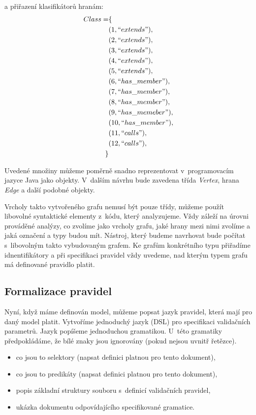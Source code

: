 a přiřazení klasifikátorů hranám:
\begin{align*}
  Class = &\{ \\
  &(1, ``extends"), \\
  &(2, ``extends"), \\
  &(3, ``extends"), \\
  &(4, ``extends"), \\
  &(5, ``extends"), \\
  &(6, ``has\_member"), \\
  &(7, ``has\_member"), \\
  &(8, ``has\_member"), \\
  &(9, ``has\_memeber"), \\
  &(10, ``has\_member"), \\
  &(11, ``calls"), \\
  &(12, ``calls"), \\
  \}
\end{align*}

Uvedené množiny můžeme poměrně snadno reprezentovat v~programovacím jazyce Java jako objekty. V~dalším návrhu bude zavedena třída \emph{Vertex}, hrana \emph{Edge} a další podobné objekty.

Vrcholy takto vytvořeného grafu nemusí být pouze třídy, můžeme použít libovolné syntaktické elementy z~kódu, který analyzujeme. Vždy záleží na úrovni prováděné analýzy, co zvolíme jako vrcholy grafu, jaké hrany mezi nimi zvolíme a jaká označení a typy budou mít. Nástroj, který budeme navrhovat bude počítat s~libovolným takto vybudovaným grafem. Ke grafům konkrétního typu přiřadíme idnentifikátory a při specifikaci pravidel vždy uvedeme, nad kterým typem grafu má definované pravidlo platit.

\subsection{Formalizace pravidel}
\label{design-rules_formalization}
Nyní, když máme definován model, můžeme popsat jazyk pravidel, která mají pro daný model platit. Vytvoříme jednoduchý jazyk (DSL) pro specifikaci validačních parametrů. Jazyk popíšeme jednoduchou gramatikou. U~této gramatiky předpokládáme, že bílé znaky jsou ignorovány (pokud nejsou uvnitř řetězce).


\begin{itemize}
\item co jsou to selektory (napsat definici platnou pro tento dokument),
\item co jsou to predikáty (napsat definici platnou pro tento dokument),
\item popis základní struktury souboru s~definicí validačních pravidel,
\item ukázka dokumentu odpovídajícího specifikované gramatice.
\end{itemize}

